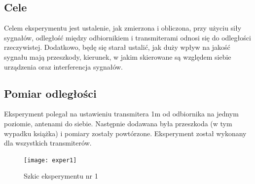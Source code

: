 \documentclass{article}
\begin{document}
		\subsection{Cele}
			Celem eksperymentu jest ustalenie, jak zmierzona i obliczona, przy użyciu siły sygnałów, odległość między odbiornikiem i transmiterami odnosi się do odległości rzeczywistej. Dodatkowo, będę się starał ustalić, jak duży wpływ na jakość sygnału mają przeszkody, kierunek, w jakim skierowane są względem siebie urządzenia oraz interferencja sygnałów.
		\subsection{Pomiar odległości}
			Eksperyment polegał na ustawieniu transmitera 1m od odbiornika na jednym poziomie, antenami do siebie. Następnie dodawana była przeszkoda (w tym wypadku książka) i pomiary zostały powtórzone. Eksperyment został wykonany dla wszystkich transmiterów.\\			
			\begin{figure}	
				\centering			
				\caption{Szkic eksperymentu nr 1}
				\texttt{[image: exper1]}
			\end{figure}
\end{document}
